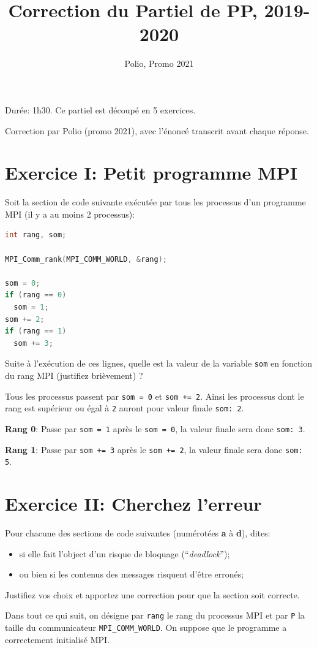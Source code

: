 \documentclass{article}
\title{Correction du Partiel de PP, 2019-2020}
\author{Polio, Promo 2021}
\begin{document}
\maketitle

Durée: 1h30. Ce partiel est découpé en 5 exercices.

Correction par Polio (promo 2021), avec l'énoncé transcrit avant chaque réponse.

\section{Exercice I: Petit programme MPI}

\begin{blockquote}
Soit la section de code suivante exécutée par tous les processus d'un programme MPI (il y a au moins 2 processus):

\begin{lstlisting}[language=c]
int rang, som;

MPI_Comm_rank(MPI_COMM_WORLD, &rang);

som = 0;
if (rang == 0)
  som = 1;
som += 2;
if (rang == 1)
  som += 3;
\end{lstlisting}

Suite à l'exécution de ces lignes, quelle est la valeur de la variable \texttt{som} en fonction du rang MPI (justifiez brièvement) ?
\end{blockquote}

Tous les processus passent par \texttt{som = 0} et \texttt{som += 2}. Ainsi les processus dont le rang est supérieur ou égal à \texttt{2} auront pour valeur finale \texttt{som: 2}.

\textbf{Rang 0}: Passe par \texttt{som = 1} après le \texttt{som = 0}, la valeur finale sera donc \texttt{som: 3}.

\textbf{Rang 1}: Passe par \texttt{som += 3} après le \texttt{som += 2}, la valeur finale sera donc \texttt{som: 5}.

\section{Exercice II: Cherchez l'erreur}

\begin{blockquote}
Pour chacune des sections de code suivantes (numérotées \textbf{a} à \textbf{d}), dites:

\begin{itemize}
\item si elle fait l'object d'un risque de bloquage (``\emph{deadlock}'');
\item ou bien si les contenus des messages risquent d'être erronés;
\end{itemize}

Justifiez vos choix et apportez une correction pour que la section soit correcte.

Dans tout ce qui suit, on désigne par \texttt{rang} le rang du processus MPI et par \texttt{P} la taille du communicateur \texttt{MPI\_COMM\_WORLD}. On suppose que le programme a correctement initialisé MPI.
\end{blockquote}
\end{document}
